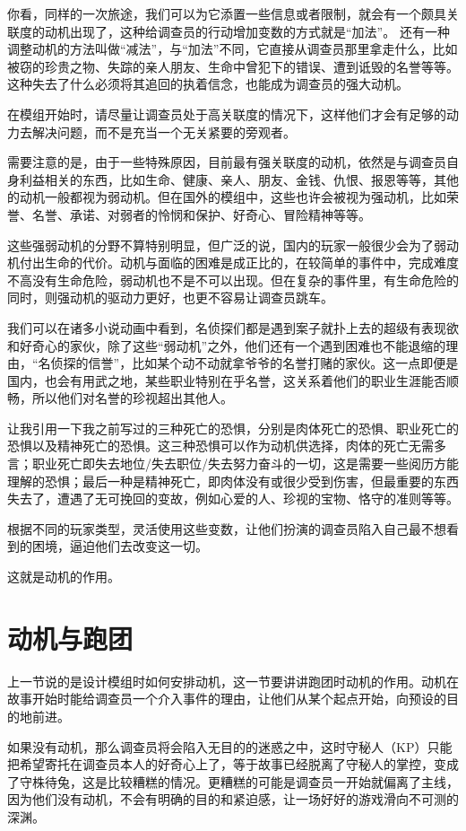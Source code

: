 \documentclass[a4paper,zihao=-4,notitlepage,twoside,openright]{ctexart}
\begin{document}
你看，同样的一次旅途，我们可以为它添置一些信息或者限制，就会有一个颇具关联度的动机出现了，这种给调查员的行动增加变数的方式就是“加法”。 还有一种调整动机的方法叫做“减法”，与“加法”不同，它直接从调查员那里拿走什么，比如被窃的珍贵之物、失踪的亲人朋友、生命中曾犯下的错误、遭到诋毁的名誉等等。这种失去了什么必须将其追回的执着信念，也能成为调查员的强大动机。

在模组开始时，请尽量让调查员处于高关联度的情况下，这样他们才会有足够的动力去解决问题，而不是充当一个无关紧要的旁观者。

需要注意的是，由于一些特殊原因，目前最有强关联度的动机，依然是与调查员自身利益相关的东西，比如生命、健康、亲人、朋友、金钱、仇恨、报恩等等，其他的动机一般都视为弱动机。但在国外的模组中，这些也许会被视为强动机，比如荣誉、名誉、承诺、对弱者的怜悯和保护、好奇心、冒险精神等等。

这些强弱动机的分野不算特别明显，但广泛的说，国内的玩家一般很少会为了弱动机付出生命的代价。动机与面临的困难是成正比的，在较简单的事件中，完成难度不高没有生命危险，弱动机也不是不可以出现。但在复杂的事件里，有生命危险的同时，则强动机的驱动力更好，也更不容易让调查员跳车。

我们可以在诸多小说动画中看到，名侦探们都是遇到案子就扑上去的超级有表现欲和好奇心的家伙，除了这些“弱动机”之外，他们还有一个遇到困难也不能退缩的理由，“名侦探的信誉”，比如某个动不动就拿爷爷的名誉打赌的家伙。这一点即便是国内，也会有用武之地，某些职业特别在乎名誉，这关系着他们的职业生涯能否顺畅，所以他们对名誉的珍视超出其他人。

让我引用一下我之前写过的三种死亡的恐惧，分别是肉体死亡的恐惧、职业死亡的恐惧以及精神死亡的恐惧。这三种恐惧可以作为动机供选择，肉体的死亡无需多言；职业死亡即失去地位/失去职位/失去努力奋斗的一切，这是需要一些阅历方能理解的恐惧；最后一种是精神死亡，即肉体没有或很少受到伤害，但最重要的东西失去了，遭遇了无可挽回的变故，例如心爱的人、珍视的宝物、恪守的准则等等。

根据不同的玩家类型，灵活使用这些变数，让他们扮演的调查员陷入自己最不想看到的困境，逼迫他们去改变这一切。

这就是动机的作用。

\section{动机与跑团}

上一节说的是设计模组时如何安排动机，这一节要讲讲跑团时动机的作用。动机在故事开始时能给调查员一个介入事件的理由，让他们从某个起点开始，向预设的目的地前进。

如果没有动机，那么调查员将会陷入无目的的迷惑之中，这时守秘人（KP）只能把希望寄托在调查员本人的好奇心上了，等于故事已经脱离了守秘人的掌控，变成了守株待兔，这是比较糟糕的情况。更糟糕的可能是调查员一开始就偏离了主线，因为他们没有动机，不会有明确的目的和紧迫感，让一场好好的游戏滑向不可测的深渊。
\end{document}
